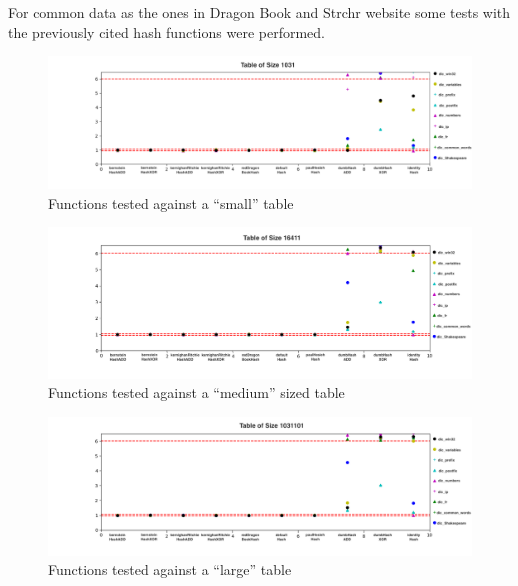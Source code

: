 For common data as the ones in Dragon Book and Strchr website \citep{DragonHashFunc} some tests with the previously cited hash functions were performed.

\begin{figure}[h!]
  \centering
  \hspace*{-3cm}
  \includegraphics[width=20cm]{figuras/1031HashFunc.png}
  \caption{Functions tested against a ``small'' table}
\end{figure}

\medskip

\begin{figure}[h!]
  \centering
  \hspace*{-3cm}
  \includegraphics[width=20cm]{figuras/16411HashFunc.png}
  \caption{Functions tested against a ``medium'' sized table}
\end{figure}

\newpage

\begin{figure}[h!]
  \centering
  \hspace*{-2cm}
  \includegraphics[width=20cm]{figuras/1031101HashFunc.png}
  \caption{Functions tested against a ``large'' table}
\end{figure}

